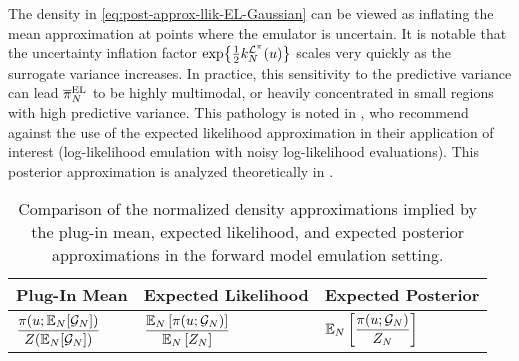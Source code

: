 \documentclass[12pt]{article}
\begin{document}
The density in \cref{eq:post-approx-llik-EL-Gaussian} can be viewed as inflating the mean approximation 
at points where the emulator is uncertain. 
It is notable that the uncertainty inflation factor $\Exp{\frac{1}{2}\emKer[\Ndesign]{\lpost}(\Par)}$ scales 
very quickly as the surrogate variance increases.
In practice, this sensitivity to the predictive variance can lead $\postApproxNormMarg[\Ndesign]$ to be highly 
multimodal, or heavily concentrated in small regions with high predictive variance. 
This pathology is noted in \cite{VehtariParallelGP}, who recommend against the use of the expected
likelihood approximation in their application of interest (log-likelihood emulation with noisy log-likelihood evaluations). 
This posterior approximation is analyzed theoretically in \citet{StuartTeck1,StuartTeck2,GP_PDE_priors,random_fwd_models,TeckHyperpar}.

\begin{table}[h]
\centering
\begin{tabular}{>{\centering\arraybackslash}p{4cm} >{\centering\arraybackslash}p{5cm} >{\centering\arraybackslash}p{5cm}}
\toprule
\textbf{Plug-In Mean} & \textbf{Expected Likelihood} & \textbf{Expected Posterior} \\
\midrule
$\displaystyle \frac{\postDens(\Par; \E_{\Ndesign}[\fwdEm[\Ndesign]])}{\normCst(\E_{\Ndesign}[\fwdEm[\Ndesign]])}$ & 
$\displaystyle \frac{\E_{\Ndesign}\left[\postDens(\Par; \fwdEm[\Ndesign])\right]}{\E_{\Ndesign}\left[\normCstEm[\Ndesign]\right]}$ & 
$\displaystyle \E_{\Ndesign}\left[\frac{\postDens(\Par; \fwdEm[\Ndesign])}{\normCstEm[\Ndesign]}\right]$ \\
\bottomrule
\end{tabular}
\caption{Comparison of the normalized density approximations implied by the plug-in mean, expected likelihood,
and expected posterior approximations in the forward model emulation setting.}
\label{tab:post-approx-comparison}
\end{table}
\end{document}
